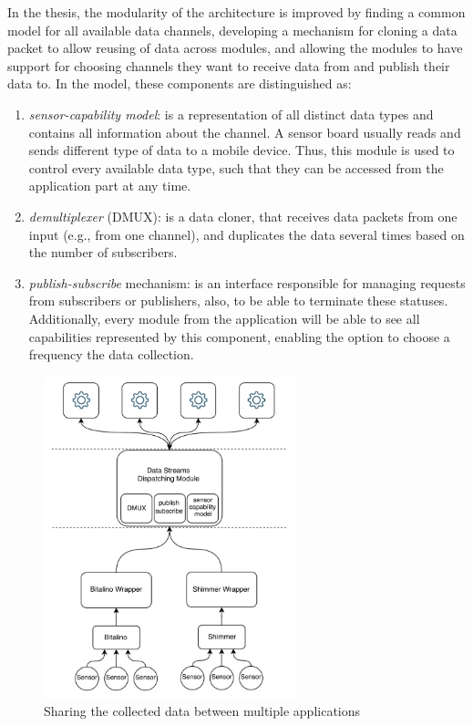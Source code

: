 In the thesis, the modularity of the architecture is improved by finding a common model for all available data channels, developing a mechanism for cloning a data packet to allow reusing of data across modules, and allowing the modules to have support for choosing channels they want to receive data from and publish their data to. In the model, these components are distinguished as: 
\begin{enumerate}
    \item \textit{sensor-capability model}: is a representation of all distinct data types and contains all information about the channel. A sensor board usually reads and sends different type of data to a mobile device. Thus, this module is used to control every available data type, such that they can be accessed from the application part at any time.
    \item \textit{demultiplexer} (DMUX): is a data cloner, that receives data packets from one input (e.g., from one channel), and duplicates the data several times based on the number of subscribers.
    \item \textit{publish-subscribe} mechanism: is an interface responsible for managing requests from subscribers or publishers, also, to be able to terminate these statuses. Additionally, every module from the application will be able to see all capabilities represented by this component, enabling the option to choose a frequency the data collection.
\end{enumerate}

\begin{figure}
    \centering
    \includegraphics[width=0.65\textwidth]{images/demux.png}
    \caption{Sharing the collected data between multiple applications \cite{daniel}}
    \label{fig:demux}
\end{figure}

